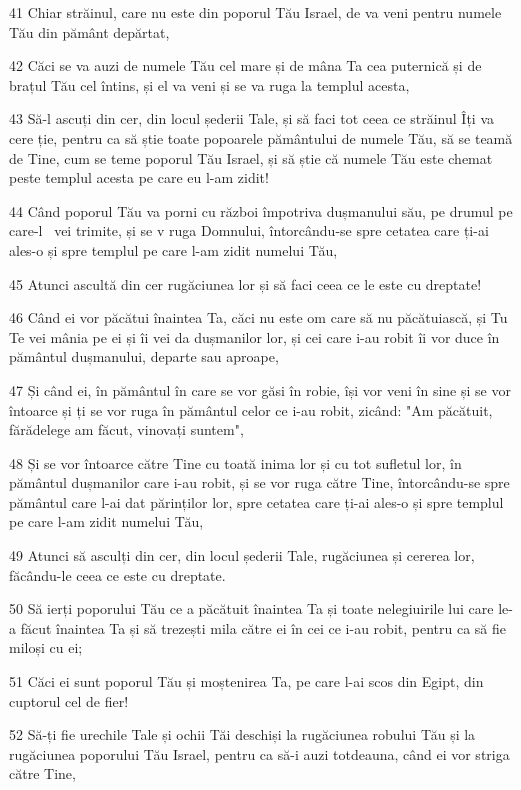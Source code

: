 \par 41 Chiar străinul, care nu este din poporul Tău Israel, de va veni pentru numele Tău din pământ depărtat,
\par 42 Căci se va auzi de numele Tău cel mare și de mâna Ta cea puternică și de brațul Tău cel întins, și el va veni și se va ruga la templul acesta,
\par 43 Să-l ascuți din cer, din locul șederii Tale, și să faci tot ceea ce străinul Îți va cere ție, pentru ca să știe toate popoarele pământului de numele Tău, să se teamă de Tine, cum se teme poporul Tău Israel, și să știe că numele Tău este chemat peste templul acesta pe care eu l-am zidit!
\par 44 Când poporul Tău va porni cu război împotriva dușmanului său, pe drumul pe care-l  vei trimite, și se v ruga Domnului, întorcându-se spre cetatea care ți-ai ales-o și spre templul pe care l-am zidit numelui Tău,
\par 45 Atunci ascultă din cer rugăciunea lor și să faci ceea ce le este cu dreptate!
\par 46 Când ei vor păcătui înaintea Ta, căci nu este om care să nu păcătuiască, și Tu Te vei mânia pe ei și îi vei da dușmanilor lor, și cei care i-au robit îi vor duce în pământul dușmanului, departe sau aproape,
\par 47 Și când ei, în pământul în care se vor găsi în robie, își vor veni în sine și se vor întoarce și ți se vor ruga în pământul celor ce i-au robit, zicând: "Am păcătuit, fărădelege am făcut, vinovați suntem",
\par 48 Și se vor întoarce către Tine cu toată inima lor și cu tot sufletul lor, în pământul dușmanilor care i-au robit, și se vor ruga către Tine, întorcându-se spre pământul care l-ai dat părinților lor, spre cetatea care ți-ai ales-o și spre templul pe care l-am zidit numelui Tău,
\par 49 Atunci să asculți din cer, din locul șederii Tale, rugăciunea și cererea lor, făcându-le ceea ce este cu dreptate.
\par 50 Să ierți poporului Tău ce a păcătuit înaintea Ta și toate nelegiuirile lui care le-a făcut înaintea Ta și să trezești mila către ei în cei ce i-au robit, pentru ca să fie miloși cu ei;
\par 51 Căci ei sunt poporul Tău și moștenirea Ta, pe care l-ai scos din Egipt, din cuptorul cel de fier!
\par 52 Să-ți fie urechile Tale și ochii Tăi deschiși la rugăciunea robului Tău și la rugăciunea poporului Tău Israel, pentru ca să-i auzi totdeauna, când ei vor striga către Tine,
